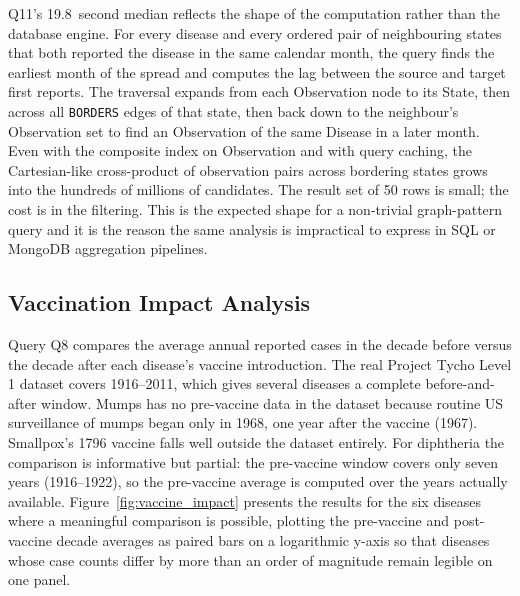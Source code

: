 \documentclass[12pt,a4paper]{article}
\begin{document}
Q11's 19.8~second median reflects the shape of the computation rather than the database engine. For every disease and every ordered pair of neighbouring states that both reported the disease in the same calendar month, the query finds the earliest month of the spread and computes the lag between the source and target first reports. The traversal expands from each Observation node to its State, then across all \texttt{BORDERS} edges of that state, then back down to the neighbour's Observation set to find an Observation of the same Disease in a later month. Even with the composite index on Observation and with query caching, the Cartesian-like cross-product of observation pairs across bordering states grows into the hundreds of millions of candidates. The result set of 50 rows is small; the cost is in the filtering. This is the expected shape for a non-trivial graph-pattern query and it is the reason the same analysis is impractical to express in SQL or MongoDB aggregation pipelines.

\subsection{Vaccination Impact Analysis}

Query Q8 compares the average annual reported cases in the decade before versus the decade after each disease's vaccine introduction. The real Project Tycho Level 1 dataset covers 1916--2011, which gives several diseases a complete before-and-after window. Mumps has no pre-vaccine data in the dataset because routine US surveillance of mumps began only in 1968, one year after the vaccine (1967). Smallpox's 1796 vaccine falls well outside the dataset entirely. For diphtheria the comparison is informative but partial: the pre-vaccine window covers only seven years (1916--1922), so the pre-vaccine average is computed over the years actually available. Figure~\ref{fig:vaccine_impact} presents the results for the six diseases where a meaningful comparison is possible, plotting the pre-vaccine and post-vaccine decade averages as paired bars on a logarithmic y-axis so that diseases whose case counts differ by more than an order of magnitude remain legible on one panel.
\end{document}
